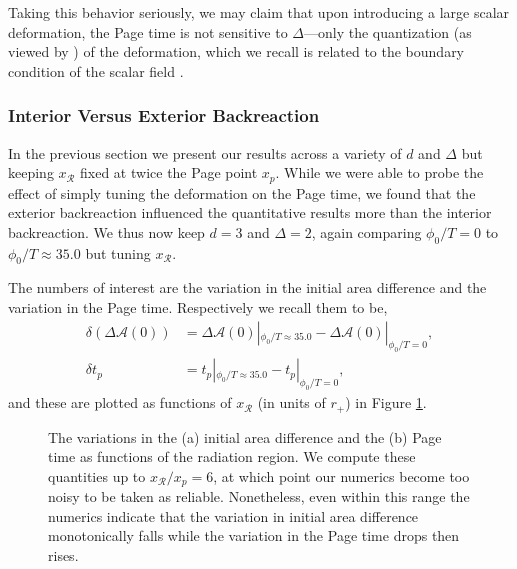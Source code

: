 \documentclass[12pt,a4paper]{article}
\begin{document}
Taking this behavior seriously, we may claim that upon introducing a large scalar deformation, the Page time is not sensitive to $\Delta$---only the quantization (as viewed by \cite{Klebanov:1999tb}) of the deformation, which we recall is related to the boundary condition of the scalar field \cite{Minces:1999eg}.

\subsubsection{Interior Versus Exterior Backreaction}\label{sec3.2.3}

In the previous section we present our results across a variety of $d$ and $\Delta$ but keeping $x_\mathcal{R}$ fixed at twice the Page point $x_p$. While we were able to probe the effect of simply tuning the deformation on the Page time, we found that the exterior backreaction influenced the quantitative results more than the interior backreaction. We thus now keep $d = 3$ and $\Delta = 2$, again comparing $\phi_0/T = 0$ to $\phi_0/T \approx 35.0$ but tuning $x_\mathcal{R}$.

The numbers of interest are the variation in the initial area difference and the variation in the Page time. Respectively we recall them to be,
\begin{align}
\delta(\Delta\mathcal{A}(0))
&= \Delta\mathcal{A}(0)|_{\phi_0/T \approx 35.0} - \Delta\mathcal{A}(0)|_{\phi_0/T = 0},\\
\delta t_p
&= t_p|_{\phi_0/T \approx 35.0} - t_p|_{\phi_0/T = 0},
\end{align}
and these are plotted as functions of $x_\mathcal{R}$ (in units of $r_+$) in Figure \ref{figs:variationRadEnd}.

\begin{figure}
\centering
{}\qquad
{}
\caption{The variations in the (a) initial area difference and the (b) Page time as functions of the radiation region. We compute these quantities up to $x_\mathcal{R}/x_p = 6$, at which point our numerics become too noisy to be taken as reliable. Nonetheless, even within this range the numerics indicate that the variation in initial area difference monotonically falls while the variation in the Page time drops then rises.}
\label{figs:variationRadEnd}
\end{figure}
\end{document}
